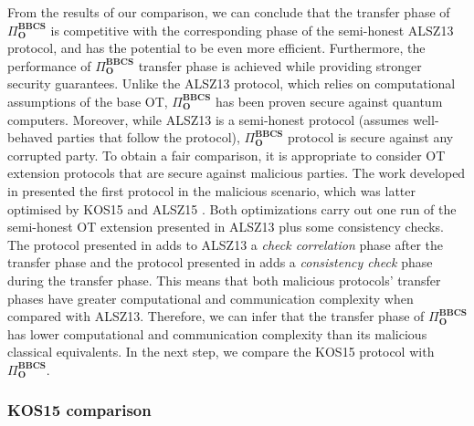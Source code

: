 
From the results of our comparison, we can conclude that the transfer phase of $\Pi^{\textbf{BBCS}}_{\textbf{O}}$ is competitive with the corresponding phase of the semi-honest ALSZ13 protocol, and has the potential to be even more efficient. Furthermore, the performance of $\Pi^{\textbf{BBCS}}_{\textbf{O}}$ transfer phase is achieved while providing stronger security guarantees. Unlike the ALSZ13 protocol, which relies on computational assumptions of the base OT, $\Pi^{\textbf{BBCS}}_{\textbf{O}}$ has been proven secure against quantum computers. Moreover, while ALSZ13 is a semi-honest protocol (assumes well-behaved parties that follow the protocol), $\Pi^{\textbf{BBCS}}_{\textbf{O}}$ protocol is secure against any corrupted party. To obtain a fair comparison, it is appropriate to consider OT extension protocols that are secure against malicious parties. The work developed in \cite{IKNP03} presented the first protocol in the malicious scenario, which was latter optimised by KOS15 \cite{KOS15} and ALSZ15 \cite{ALSZ15}. Both optimizations carry out one run of the semi-honest OT extension presented in ALSZ13 plus some consistency checks. The protocol presented in \cite{KOS15} adds to ALSZ13 a \textit{check correlation} phase after the transfer phase and the protocol presented in \cite{ALSZ15} adds a \textit{consistency check} phase during the transfer phase. This means that both malicious protocols' transfer phases have greater computational and communication complexity when compared with ALSZ13. Therefore, we can infer that the transfer phase of $\Pi^{\textbf{BBCS}}_{\textbf{O}}$ has lower computational and communication complexity than its malicious classical equivalents. In the next step, we compare the KOS15 protocol \cite{KOS15} with $\Pi^{\textbf{BBCS}}_{\textbf{O}}$.


\subsubsection{KOS15 comparison}\label{Mal-Ext-OT_comp}

